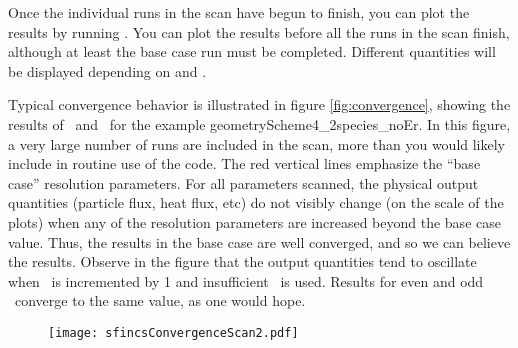 Once the individual runs in the scan have begun to finish, you can plot the results by running \sfincsScanPlot.
You can plot the results before all the runs in the scan finish, although at least the base case
run must be completed.  Different quantities will be displayed depending on
 and .

Typical convergence behavior is illustrated in figure \ref{fig:convergence},
showing the results of \sfincsScan~and \sfincsScanPlot~for the example
{\ttfamily geometryScheme4\_2species\_noEr}.
In this figure, a very large number of runs are included in the scan,
more than you would likely include in routine use of the code.
The red vertical lines emphasize the ``base case'' resolution parameters.
For all parameters scanned, the physical output quantities (particle flux, heat flux, etc)
do not visibly change (on the scale of the plots) when any of the resolution parameters
are increased beyond the base case value.  Thus, the results in the base case are well converged,
and so we can believe the results.
Observe in the figure that the output quantities tend to oscillate when \Nxi~is incremented by 1 and insufficient
\Nxi~is used. Results for even and odd \Nxi~converge to the same value, as one would hope.

\begin{figure}
\begin{center}
\texttt{[image: sfincsConvergenceScan2.pdf]}
\end{center}
\end{figure}

